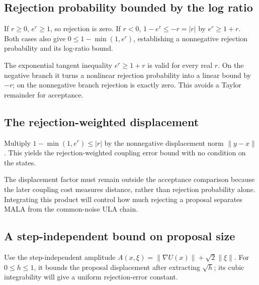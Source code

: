 \documentclass[11pt,a4paper]{report}
\begin{document}
\subsection{\texorpdfstring{Rejection probability bounded by the log ratio}{Rejection probability bounded by the log ratio}}
\label{report-step-UnadjustedLangevin-MALAError-lean-7}


If \(r\ge0\), \(e^r\ge1\), so rejection is zero. If \(r<0\), \(1-e^r\le-r=|r|\) by \(e^r\ge1+r\). Both cases also give \(0\le1-\min(1,e^r)\), establishing a nonnegative rejection probability and its log-ratio bound.



The exponential tangent inequality \(e^r\ge1+r\) is valid for every real \(r\). On the negative branch it turns a nonlinear rejection probability into a linear bound by \(-r\); on the nonnegative branch rejection is exactly zero. This avoids a Taylor remainder for acceptance.

\subsection{\texorpdfstring{The rejection-weighted displacement}{The rejection-weighted displacement}}
\label{report-step-UnadjustedLangevin-MALAError-lean-8}


Multiply \(1-\min(1,e^r)\le|r|\) by the nonnegative displacement norm \(\|y-x\|\). This yields the rejection-weighted coupling error bound with no condition on the states.



The displacement factor must remain outside the acceptance comparison because the later coupling cost measures distance, rather than rejection probability alone. Integrating this product will control how much rejecting a proposal separates MALA from the common-noise ULA chain.

\subsection{\texorpdfstring{A step-independent bound on proposal size}{A step-independent bound on proposal size}}
\label{report-step-UnadjustedLangevin-MALAError-lean-9}


Use the step-independent amplitude \(A(x,\xi)=\|\nabla U(x)\|+\sqrt2\|\xi\|\). For \(0\le h\le1\), it bounds the proposal displacement after extracting \(\sqrt h\); its cubic integrability will give a uniform rejection-error constant.
\end{document}
